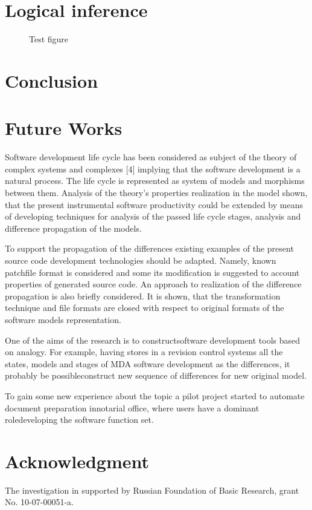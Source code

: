 \documentclass{intech}
\begin{document}
\section{Logical inference}
\label{sec:log-inf}

\begin{figure}[htb]
  \centering

  \caption{Test figure}
  \label{fig:test-fig}
\end{figure}

\begin{table}[htb]
  \centering

  \caption{Test Table}
  \label{tab:test-tbl}
\end{table}

\section{Conclusion}

\section{Future Works}

Software development life cycle has been considered as subject of the theory of complex systems and complexes [4] implying that the software development is a natural process. The life cycle is represented as system of models and morphisms between them. Analysis of the theory’s properties realization in the model shown, that the present instrumental software productivity could be extended by means of developing techniques for analysis of the passed life cycle stages, analysis and difference propagation of the models.

To support the propagation of the differences existing examples of the present source code development technologies should be adapted. Namely, known patchfile format is considered and some its modification is suggested to account properties of generated source code. An approach to realization of the difference propagation is also briefly considered. It is shown, that the transformation technique and file formats are closed with respect to original formats of the software models representation.

One of the aims of the research is to constructsoftware development tools based on analogy. For example, having stores in a revision control systems all the states, models and stages of MDA software development as the differences, it probably be possibleconstruct new sequence of differences for new original model.

To gain some new experience about the topic a pilot project started to automate document preparation innotarial office, where users have a dominant roledeveloping the software function set.

\section{Acknowledgment}


The investigation in supported by Russian Foundation
of Basic Research, grant No. 10-07-00051-a.
\end{document}
